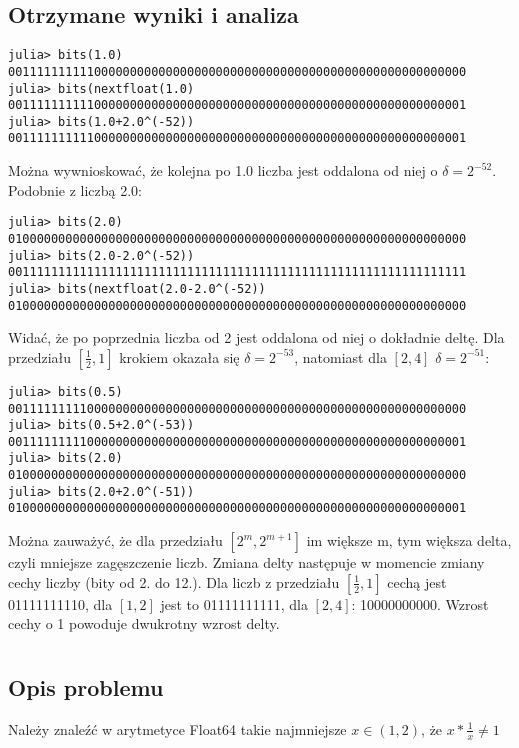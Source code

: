 \documentclass[11pt]{article}
\theoremstyle{remark}
\begin{document}
\subsection{Otrzymane wyniki i analiza}
\begin{lstlisting}[style=BashStyle]
julia> bits(1.0)
0011111111110000000000000000000000000000000000000000000000000000
julia> bits(nextfloat(1.0)
0011111111110000000000000000000000000000000000000000000000000001
julia> bits(1.0+2.0^(-52))
0011111111110000000000000000000000000000000000000000000000000001
\end{lstlisting}
Można wywnioskować, że kolejna po 1.0 liczba jest oddalona od niej o $\delta=2^{-52}$. Podobnie z liczbą 2.0:
\begin{lstlisting}[style=BashStyle]
julia> bits(2.0)
0100000000000000000000000000000000000000000000000000000000000000
julia> bits(2.0-2.0^(-52))
0011111111111111111111111111111111111111111111111111111111111111
julia> bits(nextfloat(2.0-2.0^(-52))
0100000000000000000000000000000000000000000000000000000000000000
\end{lstlisting}
Widać, że po poprzednia liczba od 2 jest oddalona od niej o dokładnie deltę.
Dla przedziału $[\frac{1}{2}, 1]$ krokiem okazała się $\delta = 2^{-53}$, natomiast dla $[2, 4]$ $\delta = 2^{-51}$:
\begin{lstlisting}[style=BashStyle]
julia> bits(0.5)
0011111111100000000000000000000000000000000000000000000000000000
julia> bits(0.5+2.0^(-53))
0011111111100000000000000000000000000000000000000000000000000001
julia> bits(2.0)
0100000000000000000000000000000000000000000000000000000000000000
julia> bits(2.0+2.0^(-51))
0100000000000000000000000000000000000000000000000000000000000001
\end{lstlisting}
Można zauważyć, że dla przedziału $[2^m, 2^{m+1}]$ im większe m, tym większa delta, czyli mniejsze zagęszczenie liczb. Zmiana delty następuje w momencie zmiany cechy liczby (bity od 2. do 12.). Dla liczb z przedziału $[\frac{1}{2}, 1]$ cechą jest 01111111110, dla $[1, 2]$ jest to 01111111111, dla $[2, 4]$: 10000000000. Wzrost cechy o 1 powoduje dwukrotny wzrost delty.
\section{}
\subsection{Opis problemu}
Należy znaleźć w arytmetyce Float64 takie najmniejsze $x \in (1,2)$, że $x*\frac{1}{x} \neq 1$
\end{document}
